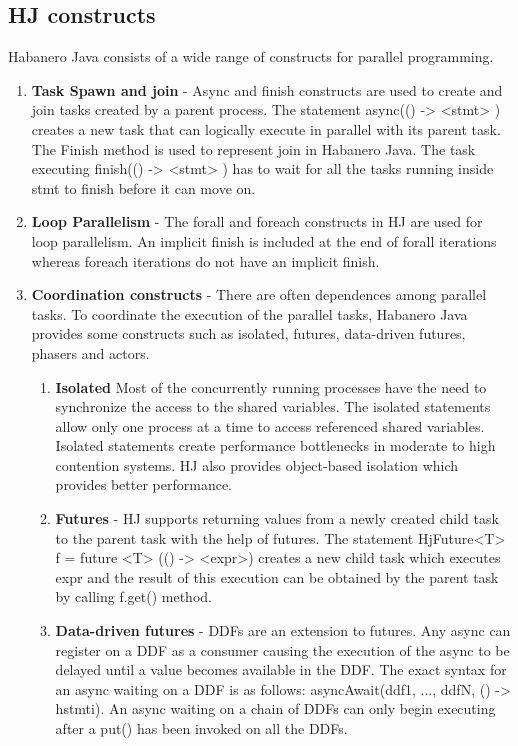 \subsection{HJ constructs}
Habanero Java consists of a wide range of constructs for parallel programming.
\begin{enumerate}
\item \textbf{Task Spawn and join} - Async and finish constructs are used to create and join tasks created by a parent process. The statement async(() -> <stmt> ) creates a new task that can logically execute in parallel with its parent task. The Finish method is used to represent join in Habanero Java. The task executing finish(() ->  <stmt> ) has to wait for all the tasks running inside stmt to finish before it can move on.
\item \textbf{Loop Parallelism} - The forall and foreach constructs in HJ are used for loop parallelism. An implicit finish is included at the end of forall iterations whereas foreach iterations do not have an implicit finish. 
\item \textbf{Coordination constructs} - There are often dependences among parallel tasks. To coordinate the execution of the parallel tasks, Habanero Java provides some constructs such as isolated, futures, data-driven futures, phasers and actors.
\begin{enumerate}
\item \textbf{Isolated}
Most of the concurrently running processes have the need to synchronize the access to the shared variables. The isolated statements allow only one process at a time to access referenced shared variables. Isolated statements create performance bottlenecks in moderate to high contention systems. HJ also provides object-based isolation which provides better performance.
\item \textbf{Futures} - HJ supports returning values from a newly created child task to the parent task with the help of futures. The statement HjFuture<T> f = future <T> (() -> <expr>) creates a new child task which executes expr and the result of this execution can be obtained by the parent task by calling f.get() method.
\item \textbf{Data-driven futures} - DDFs are an extension to futures. Any async can register on a DDF as a consumer causing the execution of the async to be delayed until a value becomes available in the DDF. The exact syntax for an async waiting on a DDF is as follows: asyncAwait(ddf1, ..., ddfN, () -> hstmti). An async waiting on a chain of DDFs can only begin executing after a put() has been invoked on all the DDFs.

\end{enumerate}
\end{enumerate}
